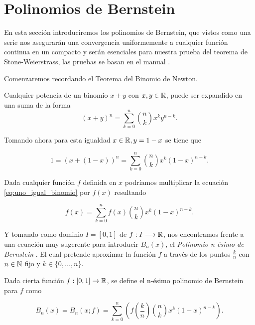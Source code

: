 %

\section{Polinomios de Bernstein}\label{ch:Bernstein}  

En esta sección introduciremos los polinomios de Bernstein,   
que vistos como una serie nos asegurarán una convergencia uniformemente a cualquier 
función continua en un compacto y serán esenciales para nuestra prueba del teorema de Stone-Weierstrass, 
las pruebas se basan en el manual \cite{the-elements-of-real-analysis}.  

Comenzaremos recordando el Teorema del Binomio de Newton. 


\begin{teorema}
    Cualquier potencia de un binomio $x+y$ con $x,y \in \mathbb{R}$,  puede ser expandido en una suma de la forma
    \[
        (x+y)^n = \sum_{k=0}^n \binom{n}{k} x^{k}y^{n-k}. 
    \]
\end{teorema}  
Tomando ahora para esta igualdad $x \in \mathbb{R}, y= 1-x$ se tiene que 

\begin{equation}\label{eq:uno_igual_binomio}
    1 = (x+ (1-x))^n = \sum_{k=0}^n \binom{n}{k} x^{k} (1-x)^{n-k}.
\end{equation}

Dada cualquier función $f$ definida en $x$ podríamos multiplicar la ecuación 
\eqref{eq:uno_igual_binomio} por $f(x)$ resultando 

\begin{equation}\label{eq:f_igual_binomio}
    f(x) = \sum_{k=0}^n f(x) \binom{n}{k} x^{k} (1-x)^{n-k}.
\end{equation} 

Y tomando como dominio $I=[0,1]$ de $f: I \longrightarrow \mathbb{R}$,
 nos encontramos
frente a una ecuación muy sugerente para introducir $B_n(x)$, el \textit{Polinomio n-ésimo  de Bernstein }. 
El cual pretende  aproximar la función $f$ a través de los puntos $\frac{k}{n}$ con $n \in \mathbb{N}$ fijo
y $k \in \{0,...,n \}.$

\begin{definicion} \label{def:Bernstein}
    Dada cierta función $f: [0,1] \rightarrow \mathbb{R}$, se define el n-ésimo polinomio de Bernstein para $f$ como 

    $$B_n(x) = B_n(x;f)=\sum_ {k=0}^{n} \left( f \left( \frac{k}{n} \right) \binom{n}{k} x^k (1-x)^{n-k} \right).$$

\end{definicion}

